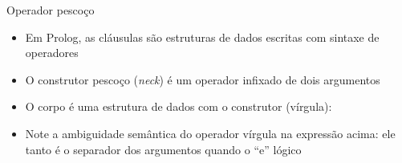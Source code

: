 \begin{frame}[fragile]{Operador pescoço}

    \begin{itemize}
        \item Em Prolog, as cláusulas são estruturas de dados escritas com sintaxe de 
        operadores

        \item O construtor pescoço (\textit{neck})  é um operador infixado de 
            dois argumentos


        \item O corpo é uma estrutura de dados com o construtor  (vírgula):


        \item Note a ambiguidade semântica do operador vírgula na expressão acima: ele tanto é 
            o separador dos argumentos quando o ``e'' lógico

    \end{itemize}

\end{frame}
